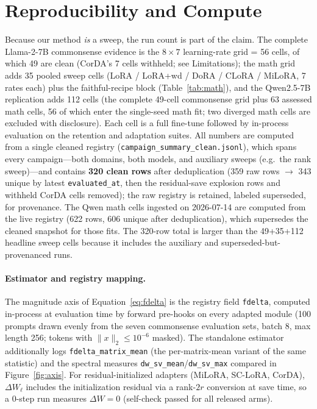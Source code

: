 \documentclass[11pt]{article}
\begin{document}
\section{Reproducibility and Compute}\label{app:repro}
Because our method \emph{is} a sweep, the run count is part of the claim. The
complete Llama-2-7B commonsense evidence is the $8\times7$ learning-rate grid = 56 cells, of
which 49 are clean (CorDA's 7 cells withheld; see Limitations); the math
grid adds 35 pooled sweep cells (LoRA / LoRA{+}wd / DoRA / CLoRA / MiLoRA, 7 rates
each) plus the faithful-recipe block (Table~\ref{tab:math}), and the
Qwen2.5-7B replication adds 112 cells (the complete 49-cell
commonsense grid plus 63 assessed math cells, 56 of which enter the single-seed
math fit; two diverged math cells are excluded with disclosure). Each cell is a full
fine-tune followed by in-process evaluation on the retention and adaptation suites.
All numbers are computed from a single cleaned registry
(\texttt{campaign\_summary\_clean.jsonl}), which spans every campaign---both
domains, both models, and auxiliary sweeps (e.g.\ the rank sweep)---and contains
\textbf{320 clean rows} after deduplication (359 raw rows $\to$ 343 unique by latest
\texttt{evaluated\_at}, then the residual-save explosion rows and withheld CorDA
cells removed); the raw registry is retained, labeled superseded, for provenance.
The Qwen math cells ingested on 2026-07-14 are computed from the live registry
(622 rows, 606 unique after deduplication), which supersedes the cleaned
snapshot for those fits.
The 320-row total is larger than the 49+35+112 headline sweep cells because it includes the
auxiliary and superseded-but-provenanced runs.

\paragraph{Estimator and registry mapping.} The magnitude axis of
Equation~\ref{eq:fdelta} is the registry field \texttt{fdelta}, computed
in-process at evaluation time by forward pre-hooks on every adapted module (100
prompts drawn evenly from the seven commonsense evaluation sets, batch 8,
max length 256; tokens with $\lVert x\rVert_2 \le 10^{-6}$ masked). The standalone
estimator additionally logs \texttt{fdelta\_matrix\_mean} (the per-matrix-mean
variant of the same statistic) and the spectral measures
\texttt{dw\_sv\_mean}/\texttt{dw\_sv\_max} compared in Figure~\ref{fig:axis}. For
residual-initialized adapters (MiLoRA, SC-LoRA, CorDA), $\Delta W_\ell$ includes
the initialization residual via a rank-$2r$ conversion at save time, so a $0$-step
run measures $\Delta W = 0$ (self-check passed for all released arms).
\end{document}
